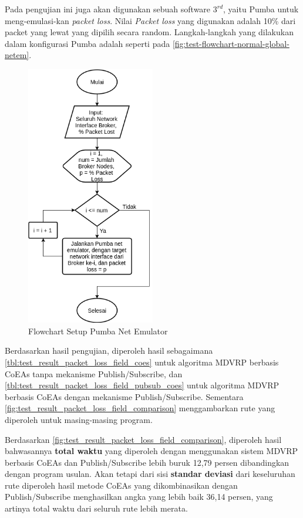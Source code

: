 Pada pengujian ini juga akan digunakan sebuah software \textit{$3^{rd}$}, yaitu Pumba \citep{1013821358660176_pumba_2016} untuk meng-emulasi-kan \textit{packet loss}. Nilai \textit{Packet loss} yang digunakan adalah 10\% dari packet yang lewat yang dipilih secara random. Langkah-langkah yang dilakukan dalam konfigurasi Pumba adalah seperti pada \autoref{fig:test-flowchart-normal-global-netem}.


\begin{figure}[!]
	\centering
	\includegraphics[width=0.5\textwidth]{Resources/Images/test-flowchart-normal-global-netem-packet-loss}
	\caption{Flowchart Setup Pumba Net Emulator}
	\label{fig:test-flowchart-normal-global-netem-packet-loss}
\end{figure}


Berdasarkan hasil pengujian, diperoleh hasil sebagaimana \autoref{tbl:test_result_packet_loss_field_coes} untuk algoritma MDVRP berbasis CoEAs tanpa mekanisme Publish/Subscribe, dan \autoref{tbl:test_result_packet_loss_field_pubsub_coes} untuk algoritma MDVRP berbasis CoEAs dengan mekanisme Publish/Subscribe. Sementara \autoref{fig:test_result_packet_loss_field_comparison} menggambarkan rute yang diperoleh untuk masing-masing program.


Berdasarkan \autoref{fig:test_result_packet_loss_field_comparison}, diperoleh hasil bahwasannya \textbf{total waktu} yang diperoleh dengan menggunakan sistem MDVRP berbasis CoEAs dan Publish/Subscribe lebih buruk 12,79 persen  dibandingkan dengan program usulan. Akan tetapi dari sisi \textbf{standar deviasi} dari keseluruhan rute diperoleh hasil metode CoEAs yang dikombinasikan dengan Publish/Subscribe menghasilkan angka yang lebih baik 36,14 persen, yang artinya total waktu dari seluruh rute lebih merata.



